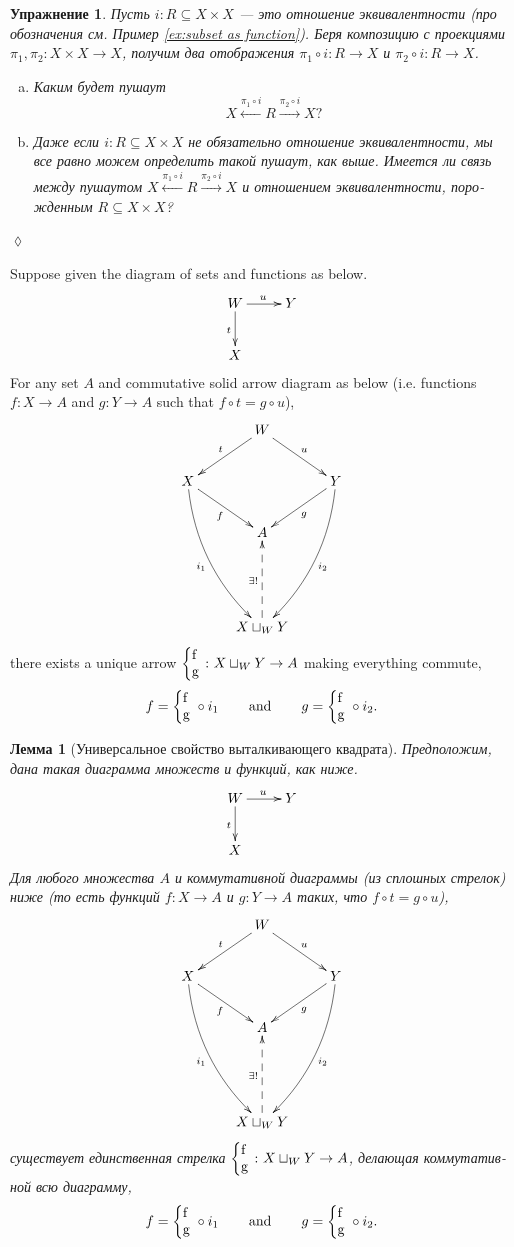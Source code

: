 \documentclass[a4paper]{book}
\def\hsp{\hspace{.3in}}
\def\to{\rightarrow}
\def\taking{\colon}
\def\ss{\subseteq}
\newcommand{\To}[1]{\xrightarrow{#1}}
\newcommand{\From}[1]{\xleftarrow{#1}}
\newcommand{\coprodmap}[2]{{\left\{\parbox{.1in}{#1\\#2}\right.}}
\newcommand{\po}[3]{\coprodmap{#1}{#2}}
\theoremstyle{myth}
\newtheorem{lemmaENG}[envENG]{\begin{english}Lemma\end{english}}
\newtheorem{lemmaRUS}[envRUS]{Лемма}
\newtheorem{excRUS}[envRUS]{Упражнение}
\newenvironment{exerciseRUS}{\begin{excRUS}}{\hspace*{\fill}$\lozenge$\end{excRUS}}
\def\sexc{\begin{enumerate}[a.)]\setlength{\itemsep}{.1cm}\setlength{\parskip}{.1cm}\item}
\def\next{\item}
\def\endsexc{\end{enumerate}}
\begin{document}
\begin{russian}
\begin{exerciseRUS}
Пусть $i\taking R\ss X\times X$ — это отношение эквивалентности (про обозначения см. Пример \ref{ex:subset as function}). Беря композицию с проекциями $\pi_1,\pi_2\taking X\times X\to X$, получим два отображения $\pi_1\circ i\taking R\to X$ и $\pi_2\circ i\taking R\to X$. 
\sexc Каким будет пушаут $$X\From{\pi_1\circ i}R\To{\pi_2\circ i}X?$$ 
\next Даже если $i\taking R\ss X\times X$ не обязательно отношение эквивалентности, мы все равно можем определить такой пушаут, как выше. Имеется ли связь между пушаутом $X\From{\pi_1\circ i}R\To{\pi_2\circ i}X$ и отношением эквивалентности, порожденным $R\ss X\times X$?
\endsexc
\end{exerciseRUS}

\begin{lemmaENG}\label{lemma:up for po}
Suppose given the diagram of sets and functions as below.
\begin{align*}
\xymatrix{W\ar[r]^u\ar[d]_t&Y\\
X}
\end{align*}
For any set $A$ and commutative solid arrow diagram as below (i.e. functions $f\taking X\to A$ and $g\taking Y\to A$ such that $f\circ t=g\circ u$), 
\begin{align}\label{dia:universal property of po}
\xymatrix{
&W\ar[dr]^u\ar[dl]_t\\
X\ar@/_1pc/[dddr]_{i_1}\ar[rd]_f&&Y\ar@/^1pc/[dddl]^{i_2}\ar[dl]^g\\
&A\\\\
&X\sqcup_WY\ar@{-->}[uu]^{\exists!}
}
\end{align}
there exists a unique arrow $\po{f}{g}{W}\taking X\sqcup_WY\to A$ making everything commute, $$f=\po{f}{g}{W}\circ i_1\hsp\text{and}\hsp g=\po{f}{g}{W}\circ i_2.$$
\end{lemmaENG}

\begin{lemmaRUS}[Универсальное свойство выталкивающего квадрата]\label{lemma:up for po}
Предположим, дана такая диаграмма множеств и функций, как ниже.
\begin{align*}
\xymatrix{W\ar[r]^u\ar[d]_t&Y\\
X}
\end{align*}
Для любого множества $A$ и коммутативной диаграммы (из сплошных стрелок) ниже (то есть функций $f\taking X\to A$ и $g\taking Y\to A$ таких, что $f\circ t=g\circ u$), 
\begin{align}\label{dia:universal property of po}
\xymatrix{
&W\ar[dr]^u\ar[dl]_t\\
X\ar@/_1pc/[dddr]_{i_1}\ar[rd]_f&&Y\ar@/^1pc/[dddl]^{i_2}\ar[dl]^g\\
&A\\\\
&X\sqcup_WY\ar@{-->}[uu]^{\exists!}
}
\end{align}
существует единственная стрелка $\po{f}{g}{W}\taking X\sqcup_WY\to A$, делающая коммутативной всю диаграмму, $$f=\po{f}{g}{W}\circ i_1\hsp\text{and}\hsp g=\po{f}{g}{W}\circ i_2.$$
\end{lemmaRUS}


\end{russian}
\end{document}
